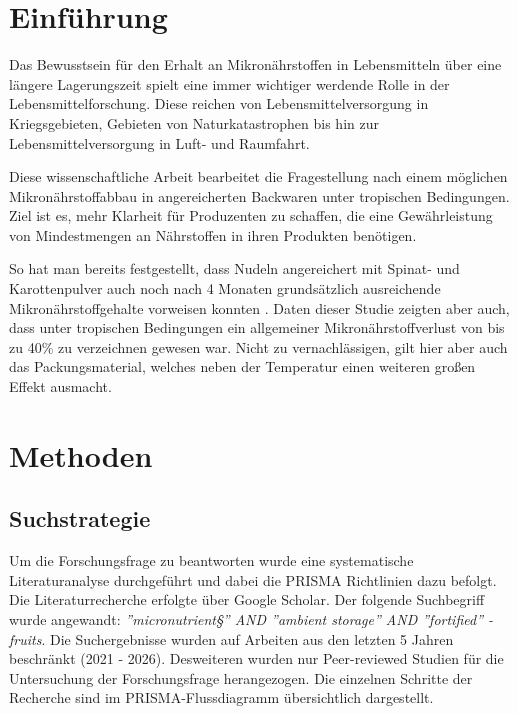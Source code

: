 \documentclass[a4paper,12pt]{article}
\begin{document}
\pagebreak
\thispagestyle{empty}
\tableofcontents


\pagebreak
{}
\setcounter{page}{1}


\section{Einführung}
Das Bewusstsein für den Erhalt an Mikronährstoffen in Lebensmitteln über eine längere Lagerungszeit spielt eine immer wichtiger werdende Rolle in der Lebensmittelforschung. Diese reichen von Lebensmittelversorgung in Kriegsgebieten, Gebieten von Naturkatastrophen bis hin zur Lebensmittelversorgung in Luft- und Raumfahrt. \par 

Diese wissenschaftliche Arbeit bearbeitet die Fragestellung nach einem möglichen Mikronährstoffabbau in angereicherten Backwaren unter tropischen Bedingungen. Ziel ist es, mehr Klarheit für Produzenten zu schaffen, die eine Gewährleistung von Mindestmengen an Nährstoffen in ihren Produkten benötigen.  \par 

So hat man bereits festgestellt, dass Nudeln angereichert mit Spinat- und Karottenpulver auch noch nach 4 Monaten grundsätzlich ausreichende Mikronährstoffgehalte vorweisen konnten \autocite{sharma}. Daten dieser Studie zeigten aber auch, dass unter tropischen Bedingungen ein allgemeiner Mikronährstoffverlust von bis zu 40\% zu verzeichnen gewesen war. Nicht zu vernachlässigen, gilt hier aber auch das Packungsmaterial, welches neben der Temperatur einen weiteren großen Effekt ausmacht. 


\par \vspace*{4mm}

\pagebreak
\section{Methoden}
\subsection{Suchstrategie}
Um die Forschungsfrage zu beantworten wurde eine systematische Literaturanalyse durchgeführt und dabei die PRISMA Richtlinien dazu befolgt. Die Literaturrecherche erfolgte über Google Scholar. Der folgende Suchbegriff wurde angewandt:
\textit{''micronutrient§'' AND ''ambient storage'' AND ''fortified'' -fruits}.
Die Suchergebnisse wurden auf Arbeiten aus den letzten 5 Jahren beschränkt (2021 - 2026). Desweiteren wurden nur Peer-reviewed Studien für die Untersuchung der Forschungsfrage herangezogen. Die einzelnen Schritte der Recherche sind im PRISMA-Flussdiagramm übersichtlich dargestellt.
\end{document}
